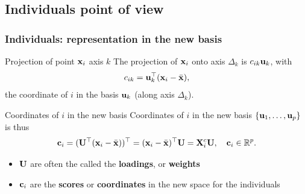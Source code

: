 \documentclass{beamer}\usepackage[]{graphicx}\usepackage[]{color}
\begin{document}
\subsection{Individuals point of view}

\begin{frame}
  \frametitle{Individuals: representation in the new basis}

  \begin{block}{Projection of point $\mathbf{x}_i$ axis $k$}
    The projection of $\mathbf{x}_i$ onto axis $\Delta_k$ is $c_{ik} \mathbf{u}_k$, with 
    \begin{equation*}
      c_{ik} = \mathbf{u}_k^\top (\mathbf{x}_i - \bar{\mathbf{x}}),
    \end{equation*}
     the coordinate of $i$ in the basis $\mathbf{u}_k$ (along axis $\Delta_k$).
  \end{block}

  \begin{block}{Coordinates of $i$ in the new basis}
    Coordinates of $i$ in the new basis $\{\mathbf{u}_1, \dots, \mathbf{u}_p\}$ is thus 
    \begin{equation*}
      \mathbf{c}_i  = (\mathbf{U}^\top (\mathbf{x}_i - \bar{\mathbf{x}}))^\top = (\mathbf{x}_i - \bar{\mathbf{x}})^\top \mathbf{U} = \mathbf{X}^c_i \mathbf{U}, \quad \mathbf{c}_i \in \mathbb{R}^p.
    \end{equation*}

    \begin{itemize}
      \item \alert{$\mathbf{U}$ are often the called the \textbf{loadings}, or \textbf{weights}}
      \item \alert{$ \mathbf{c}_i$ are the \textbf{scores} or \textbf{coordinates} in the new space for the individuals}
    \end{itemize}
  \end{block}
\end{frame}
\end{document}
